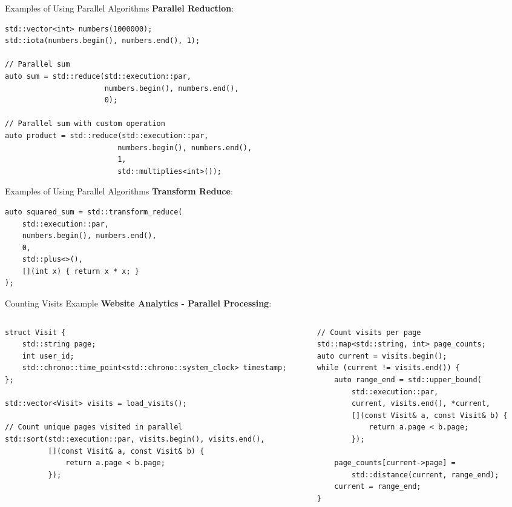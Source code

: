 \begin{frame}[fragile]{Examples of Using Parallel Algorithms}
	\textbf{Parallel Reduction}:
	\begin{verbatim}
std::vector<int> numbers(1000000);
std::iota(numbers.begin(), numbers.end(), 1);

// Parallel sum
auto sum = std::reduce(std::execution::par,
                       numbers.begin(), numbers.end(),
                       0);

// Parallel sum with custom operation
auto product = std::reduce(std::execution::par,
                          numbers.begin(), numbers.end(),
                          1,
                          std::multiplies<int>());
	\end{verbatim}
\end{frame}

\begin{frame}[fragile]{Examples of Using Parallel Algorithms}
	\textbf{Transform Reduce}:
	\begin{verbatim}
auto squared_sum = std::transform_reduce(
    std::execution::par,
    numbers.begin(), numbers.end(),
    0,
    std::plus<>(),
    [](int x) { return x * x; }
);
	\end{verbatim}
\end{frame}


\begin{frame}[fragile]{Counting Visits Example}
	\textbf{Website Analytics - Parallel Processing}:

	\begin{columns}
		\begin{column}{0.5\textwidth}
			\begin{verbatim}
struct Visit {
    std::string page;
    int user_id;
    std::chrono::time_point<std::chrono::system_clock> timestamp;
};

std::vector<Visit> visits = load_visits();

// Count unique pages visited in parallel
std::sort(std::execution::par, visits.begin(), visits.end(),
          [](const Visit& a, const Visit& b) {
              return a.page < b.page;
          });
    \end{verbatim}
		\end{column}
		\begin{column}{0.5\textwidth}
			\begin{verbatim}
// Count visits per page
std::map<std::string, int> page_counts;
auto current = visits.begin();
while (current != visits.end()) {
    auto range_end = std::upper_bound(
        std::execution::par,
        current, visits.end(), *current,
        [](const Visit& a, const Visit& b) {
            return a.page < b.page;
        });

    page_counts[current->page] =
        std::distance(current, range_end);
    current = range_end;
}
            \end{verbatim}
		\end{column}
	\end{columns}
\end{frame}

